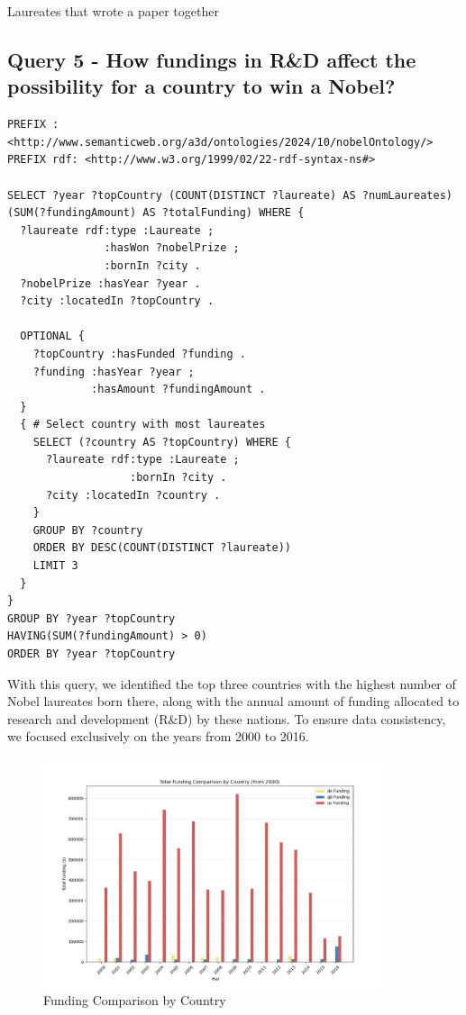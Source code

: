 \documentclass{article}
\begin{document}
Laureates that wrote a paper together

\subsection*{Query 5 - How fundings in R\&D affect the possibility for a country to win a Nobel?}

\begin{lstlisting}
PREFIX : <http://www.semanticweb.org/a3d/ontologies/2024/10/nobelOntology/>
PREFIX rdf: <http://www.w3.org/1999/02/22-rdf-syntax-ns#>

SELECT ?year ?topCountry (COUNT(DISTINCT ?laureate) AS ?numLaureates) (SUM(?fundingAmount) AS ?totalFunding) WHERE {
  ?laureate rdf:type :Laureate ;
  			   :hasWon ?nobelPrize ;
      		   :bornIn ?city .
  ?nobelPrize :hasYear ?year .
  ?city :locatedIn ?topCountry .

  OPTIONAL {
    ?topCountry :hasFunded ?funding .
    ?funding :hasYear ?year ;
     		 :hasAmount ?fundingAmount .
  } 
  { # Select country with most laureates
    SELECT (?country AS ?topCountry) WHERE {
      ?laureate rdf:type :Laureate ;
       			   :bornIn ?city .
      ?city :locatedIn ?country .
    }
    GROUP BY ?country
    ORDER BY DESC(COUNT(DISTINCT ?laureate))
    LIMIT 3
  }
}
GROUP BY ?year ?topCountry
HAVING(SUM(?fundingAmount) > 0)
ORDER BY ?year ?topCountry   
\end{lstlisting}

\vspace{1em}

With this query, we identified the top three countries with the highest number of Nobel laureates born there, along with the annual amount of funding allocated to research and development (R\&D) by these nations. To ensure data consistency, we focused exclusively on the years from 2000 to 2016.

\begin{figure}[h!]
    \centering
    \includegraphics[width=0.9\textwidth]{../queries/plots/funding_comparison_by_country.png}
    \caption{Funding Comparison by Country}
\end{figure}
\end{document}
